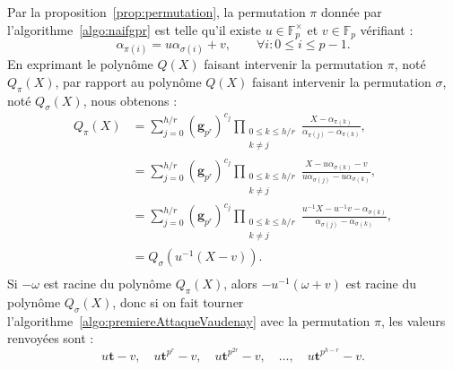 \documentclass[a4paper, titlepage, 11pt]{article}
\theoremstyle{definition}
\theoremstyle{remark}
\def\gf #1{\mathbb{F}_{#1}}
\def\mbf #1{\mathbf{#1}}
\begin{document}
Par la proposition~\ref{prop:permutation}, la permutation $\pi$ donnée par l'algorithme~\ref{algo:naifgpr} est telle qu'il existe $u \in \gf{p}^\times$ et $v \in \gf{p}$ vérifiant :
$$\alpha_{\pi(i)} = u \alpha_{\sigma(i)} + v, \qquad \forall i : 0 \leqslant i \leqslant p-1.$$
En exprimant le polynôme $Q(X)$ faisant intervenir la permutation $\pi$, noté $Q_\pi(X)$, par rapport au polynôme $Q(X)$ faisant intervenir la permutation $\sigma$, noté $Q_\sigma(X)$, nous obtenons :
\begin{align*}
Q_\pi(X) &= \sum_{j=0}^{h/r} (\mbf g_{p^r})^{c_{j}} \prod_{\substack{0\leqslant k\leqslant h/r \\ k \neq j}}\frac{X-\alpha_{\pi(k)}}{\alpha_{\pi(j)}-\alpha_{\pi(k)}}, \\
&= \sum_{j=0}^{h/r} (\mbf g_{p^r})^{c_{j}} \prod_{\substack{0\leqslant k\leqslant h/r \\ k \neq j}}\frac{X-u\alpha_{\sigma(k)} - v}{u\alpha_{\sigma(j)}-u\alpha_{\sigma(k)}}, \\
&= \sum_{j=0}^{h/r} (\mbf g_{p^r})^{c_{j}} \prod_{\substack{0\leqslant k\leqslant h/r \\ k \neq j}}\frac{u^{-1}X - u^{-1}v-\alpha_{\sigma(k)}}{\alpha_{\sigma(j)}-\alpha_{\sigma(k)}}, \\
&= Q_\sigma(u^{-1}(X -v)). \\
\end{align*}
Si $-\omega$ est racine du polynôme $Q_\pi(X)$, alors $-u^{-1}(\omega +v)$ est racine du polynôme $Q_\sigma(X)$, donc si on fait tourner l'algorithme~\ref{algo:premiereAttaqueVaudenay} avec la permutation $\pi$, les valeurs renvoyées sont :
$$u \mbf t -v,\quad u \mbf t^{p^r} -v,\quad u \mbf t^{p^{2r}} -v,\quad \dots,\quad u \mbf t^{p^{h - r}} -v.$$
\end{document}
